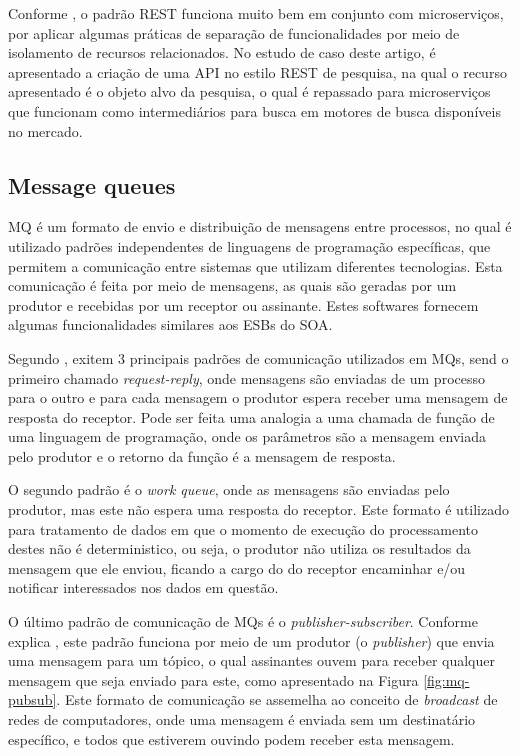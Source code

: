 Conforme , o padrão \ac{REST} funciona muito bem
em conjunto com microserviços, por aplicar algumas práticas de separação
de funcionalidades por meio de isolamento de recursos relacionados. No
estudo de caso deste artigo, é apresentado a criação de uma \ac{API} no
estilo \ac{REST} de pesquisa, na qual o recurso apresentado é o objeto
alvo da pesquisa, o qual é repassado para microserviços que funcionam
como intermediários para busca em motores de busca disponíveis no mercado.

\subsection{Message queues}

\ac{MQ} é um formato de envio e distribuição de mensagens entre processos,
no qual é utilizado padrões independentes de linguagens de programação
específicas, que permitem a comunicação entre sistemas que utilizam diferentes
tecnologias. Esta comunicação é feita por meio de mensagens, as quais são
geradas por um produtor e recebidas por um receptor ou assinante. Estes
softwares fornecem algumas funcionalidades similares aos \acp{ESB} do \ac{SOA}.

Segundo , exitem 3 principais padrões de comunicação
utilizados em \acp{MQ}, send o primeiro chamado \emph{request-reply}, onde
mensagens são enviadas de um processo para o outro e para cada mensagem o
produtor espera receber uma mensagem de resposta do receptor. Pode ser feita
uma analogia a uma chamada de função de uma linguagem de programação, onde os
parâmetros são a mensagem enviada pelo produtor e o retorno da função é a
mensagem de resposta.

O segundo padrão é o \emph{work queue}, onde as mensagens são enviadas pelo
produtor, mas este não espera uma resposta do receptor. Este formato é
utilizado para tratamento de dados em que o momento de execução do
processamento destes não é deterministico, ou seja, o produtor não utiliza
os resultados da mensagem que ele enviou, ficando a cargo do do receptor
encaminhar e/ou notificar interessados nos dados em questão.

O último padrão de comunicação de \acp{MQ} é o \emph{publisher-subscriber}.
Conforme explica , este padrão funciona por meio de
um produtor (o \emph{publisher}) que envia uma mensagem para um tópico, o
qual assinantes ouvem para receber qualquer mensagem que seja enviado para
este, como apresentado na Figura \ref{fig:mq-pubsub}. Este formato de
comunicação se assemelha ao conceito de \emph{broadcast} de redes de
computadores, onde uma mensagem é enviada sem um destinatário específico,
e todos que estiverem ouvindo podem receber esta mensagem.

